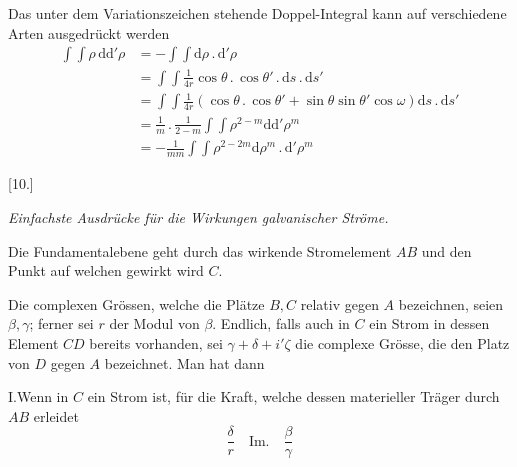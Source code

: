 Das unter dem Variationszeichen stehende Doppel-Integral kann auf verschiedene Arten ausgedrückt werden
\[
\begin{aligned}
\int\int\rho\,\mathrm d\mathrm d'\rho&=-\int\int\mathrm d\rho\,.\,\mathrm d'\rho\\
&=\int\int\frac{1}{4r}\cos\theta\,.\,\cos\theta'\,.\,\mathrm ds\,.\,\mathrm ds'\\
&=\int\int\frac{1}{4r}(\cos\theta\,.\,\cos\theta'+\sin\theta\sin\theta'\cos\omega)\mathrm ds\,.\,\mathrm ds'\\
&=\frac{1}{m}\,.\,\frac{1}{2-m}\int\int\rho^{2-m}\mathrm d\mathrm d'\rho^m\\
&=-\frac{1}{mm}\int\int\rho^{2-2m}\mathrm d\rho^m\,.\,\mathrm d'\rho^m
\end{aligned}
\]

\begin{center}[10.]\par\medskip\textit{Einfachste Ausdrücke für die Wirkungen galvanischer Ströme.}\end{center}
Die Fundamentalebene geht durch das wirkende Stromelement $AB$ und den Punkt auf welchen gewirkt wird $C$.

Die complexen Grössen, welche die Plätze $B,C$ relativ gegen $A$ bezeichnen, seien $\beta,\gamma$; ferner sei $r$ der Modul von $\beta$. Endlich, falls auch in $C$ ein Strom in dessen Element $CD$ bereits vorhanden, sei $\gamma+\delta+i'\zeta$ die complexe Grösse, die den Platz von $D$ gegen $A$ bezeichnet. Man hat dann

I.\quad Wenn in $C$ ein Strom ist, für die Kraft, welche dessen materieller Träger durch $AB$ erleidet
\[
\frac{\delta}{r}\quad\mathrm{Im.}\quad\frac{\beta}{\gamma}
\]

